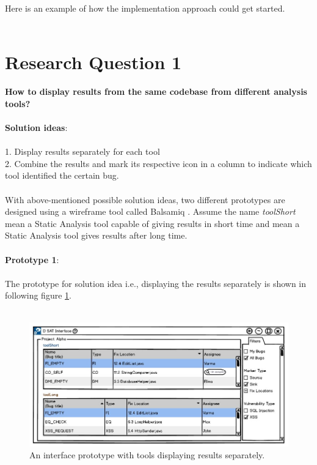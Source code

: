 Here is an example of how the implementation approach could get started. \\ \\
\section{Research Question 1}
\textbf{How to display results from the same codebase from different analysis tools?} \\ \\

\textbf{Solution ideas}: \\ \\
1. Display results separately for each tool \\
2. Combine the results and mark its respective icon in a column to indicate which tool identified the certain bug. \\ \\

With above-mentioned possible solution ideas, two different prototypes are designed using a wireframe tool called Balsamiq \cite{B}. Assume the name \textit{toolShort} mean a Static Analysis tool capable of giving results in short time and  mean a Static Analysis tool gives results after long time. \\ \\

\textbf{Prototype 1}: \\ \\

The prototype for solution idea i.e., displaying the results separately is shown in following figure \ref{fig:toolSeperate}. \\ \\

\begin{figure}[hbt!]
	\centering
	\includegraphics[width=\linewidth]{figures/d_seperate}
	\caption{An interface prototype with tools displaying results separately.}
	\label{fig:toolSeperate}
\end{figure}
\newpage

